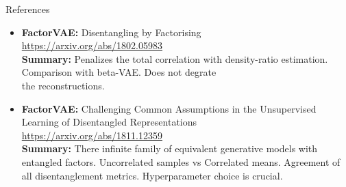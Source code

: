 \documentclass{beamer}
\begin{document}
\begin{frame}{References}
{\begin{itemize}
    \item \textbf{FactorVAE:} Disentangling by Factorising \\
    \href{https://arxiv.org/abs/1802.05983}{https://arxiv.org/abs/1802.05983} \\
    \textbf{Summary:} Penalizes the total correlation with density-ratio estimation. Comparison with beta-VAE. Does not degrate \\ the reconstructions.
    
    \item \textbf{FactorVAE:} Challenging Common Assumptions in the Unsupervised Learning of Disentangled Representations  \\
    \href{https://arxiv.org/abs/1811.12359}{https://arxiv.org/abs/1811.12359} \\
    \textbf{Summary:} There infinite family of equivalent generative models with entangled factors. Uncorrelated samples vs Correlated means. Agreement of all disentanglement metrics. Hyperparameter choice is crucial.
    
\end{itemize}
}
\end{frame}
\end{document}
